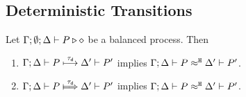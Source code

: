 




\subsection{Deterministic Transitions}
\label{app:sub_tau_inert}

		
		



\begin{proposition}
	\label{app:lem:tau_inert}
	Let  $\Gamma; \emptyset; \Delta \vdash P \triangleright \diamond$ be a balanced \HOp process.
	Then
	\begin{enumerate}[1.]
		\item	$\Gamma; \Delta \vdash P \stackrel{\tau_{\mathsf{d}}}{\longmapsto} \Delta' \vdash P'$ implies
			$\Gamma; \Delta \vdash P \approx^\mathtt{H} \Delta' \vdash P'$.
		\item	$\horel{\Gamma}{\Delta}{P}{\Hby{\dtau}}{\Delta'}{P'}$ implies
			$\Gamma; \Delta \vdash P \approx^\mathtt{H} \Delta' \vdash P'$.
	\end{enumerate}
\end{proposition}

